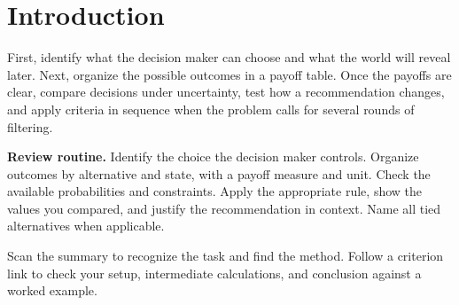 \setcounter{tocdepth}{1}
\label{toc}
\tableofcontents

\section{Introduction}
First, identify what the decision maker can choose and what the world will reveal later. Next, organize the possible outcomes in a payoff table. Once the payoffs are clear, compare decisions under uncertainty, test how a recommendation changes, and apply criteria in sequence when the problem calls for several rounds of filtering.

\textbf{Review routine.} Identify the choice the decision maker controls. Organize outcomes by alternative and state, with a payoff measure and unit. Check the available probabilities and constraints. Apply the appropriate rule, show the values you compared, and justify the recommendation in context. Name all tied alternatives when applicable.

Scan the summary to recognize the task and find the method. Follow a criterion link to check your setup, intermediate calculations, and conclusion against a worked example.

\par\nobreak
\secInicio

\clearpage
